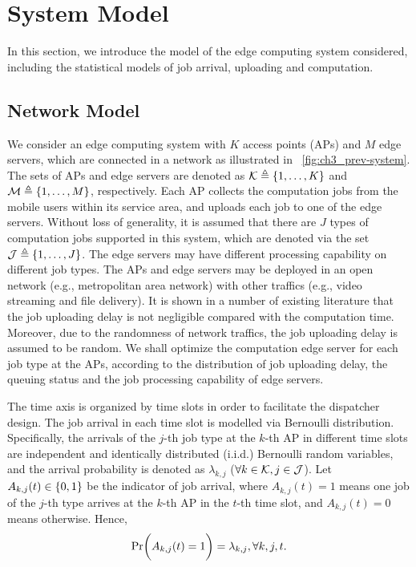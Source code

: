 
\section{System Model}
\label{sec:chapter3_prev-model}
In this section, we introduce the model of the edge computing system considered, including the statistical models of job arrival, uploading and computation.

\subsection{Network Model}
We consider an edge computing system with $K$ access points (APs) and $M$ edge servers, which are connected in a network as illustrated in \figurename~\ref{fig:ch3_prev-system}. The sets of APs and edge servers are denoted as $\mathcal{K} \triangleq \{1, \dots, K\}$ and
$\mathcal{M} \triangleq \{1, \dots, M\}$, respectively.
Each AP collects the computation jobs from the mobile users within its service area, and uploads each job to one of the edge servers.
Without loss of generality, it is assumed that there are $J$ types of computation jobs supported in this system, which are denoted via the set $\mathcal{J} \triangleq \{1, \dots, J\}$.
The edge servers may have different processing capability on different job types. The APs and edge servers may be deployed in an open network (e.g., metropolitan area network) with other traffics (e.g., video streaming and file delivery).
It is shown in a number of existing literature \cite{tan-online,liang2017} that the job uploading delay is not negligible compared with the computation time. Moreover, due to the randomness of network traffics, the job uploading delay is assumed to be random. We shall optimize the computation edge server for each job type at the APs, according to the distribution of job uploading delay, the queuing status and the job processing capability of edge servers. 

The time axis is organized by time slots in order to facilitate the dispatcher design. The job arrival in each time slot is modelled via Bernoulli distribution. Specifically, the arrivals of the $j$-th job type at the $k$-th AP in different time slots are independent and identically distributed (i.i.d.) Bernoulli random variables, and the arrival probability is denoted as $\lambda_{k,j}$ ($\forall k\in\mathcal{K}, j\in\mathcal{J}$). Let $A_{k,j}(t)\in\{0,1\}$ be the indicator of job arrival, where $A_{k,j}(t)=1$ means one job of the  $j$-th type arrives at the $k$-th AP in the $t$-th time slot, and $A_{k,j}(t)=0$ means otherwise. Hence,
\begin{align}
    \Pr\Paren{ A_{k,j}(t)=1 } = \lambda_{k,j}, \forall k,j,t.
\end{align}

